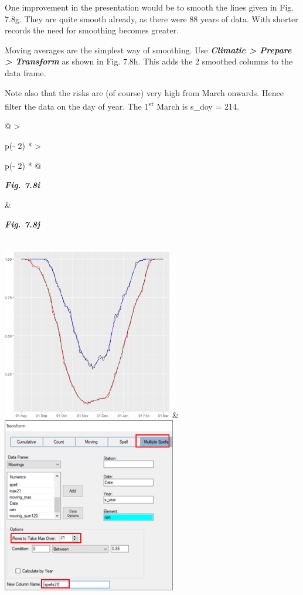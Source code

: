\documentclass[
  letterpaper,
  DIV=11,
  numbers=noendperiod]{scrreprt}
\begin{document}
One improvement in the presentation would be to smooth the lines given
in Fig. 7.8g. They are quite smooth already, as there were 88 years of
data. With shorter records the need for smoothing becomes greater.

Moving averages are the simplest way of smoothing. Use
\textbf{\emph{Climatic \textgreater{} Prepare \textgreater{} Transform}}
as shown in Fig. 7.8h. This adds the 2 smoothed columns to the data
frame.

Note also that the risks are (of course) very high from March onwards.
Hence filter the data on the day of year. The 1\textsuperscript{st}
March is s\_doy = 214.

\begin{longtable}[]{@{}
  >{\raggedright\arraybackslash}p{(\columnwidth - 2\tabcolsep) * }
  >{\raggedright\arraybackslash}p{(\columnwidth - 2\tabcolsep) * }@{}}
\toprule\noalign{}
\begin{minipage}[b]{\linewidth}\raggedright
\textbf{\emph{Fig. 7.8i}}
\end{minipage} & \begin{minipage}[b]{\linewidth}\raggedright
\textbf{\emph{Fig. 7.8j}}
\end{minipage} \\
\midrule\noalign{}
\endhead
\bottomrule\noalign{}
\endlastfoot
\includegraphics[width=2.93154in,height=2.97971in]{figures/Fig7.8i.png}
&
\includegraphics[width=2.99269in,height=3.02322in]{figures/Fig7.8j.png} \\
\end{longtable}
\end{document}
